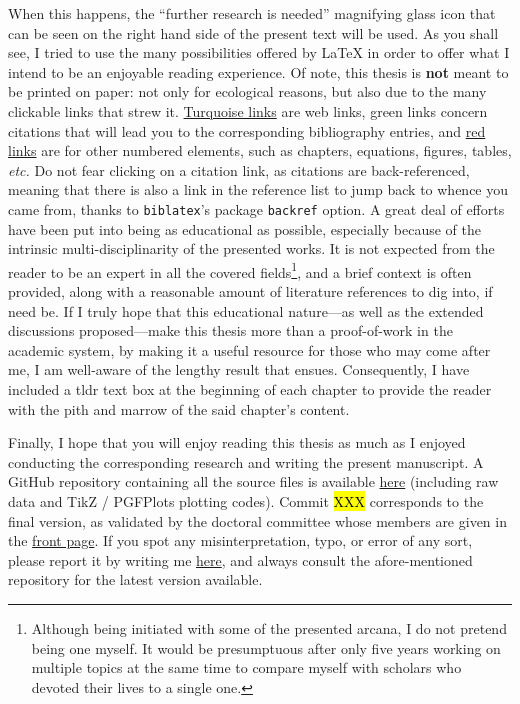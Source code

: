 \mfrin{}When this happens, the \enquote{further research is needed} magnifying glass icon that can be seen on the right hand side of the present text will be used. As you shall see, I tried to use the many possibilities offered by \LaTeX{} in order to offer what I intend to be an enjoyable reading experience. Of note, this thesis is \textbf{not} meant to be printed on paper: not only for ecological reasons, but also due to the many clickable links that strew it. \href{https://archive.org/details/lshort}{Turquoise links} are web links, green links\cite{oetiker2007} concern citations that will lead you to the corresponding bibliography entries, and \hyperlink{forechap:foreword}{red links} are for other numbered elements, such as chapters, equations, figures, tables, \emph{etc.} Do not fear clicking on a citation link, as citations are back-referenced, meaning that there is also a link in the reference list to jump back to whence you came from, thanks to \texttt{biblatex}'s package \texttt{backref} option.
\clearpage
A great deal of efforts have been put into being as educational as possible, especially because of the intrinsic multi-disciplinarity of the presented works. It is not expected from the reader to be an expert in all the covered fields\footnote{Although being initiated with some of the presented arcana, I do not pretend being one myself. It would be presumptuous after only five years working on multiple topics at the same time to compare myself with scholars who devoted their lives to a single one.}, and a brief context is often provided, along with a reasonable amount of literature references to dig into, if need be. If I truly hope that this educational nature---as well as the extended discussions proposed---make this thesis more than a proof-of-work in the academic system, \ie{} by making it a useful resource for those who may come after me, I am well-aware of the lengthy result that ensues. Consequently, I have included a \gls{tldr} text box at the beginning of each chapter to provide the reader with the pith and marrow of the said chapter's content.

Finally, I hope that you will enjoy reading this thesis as much as I enjoyed conducting the corresponding research and writing the present manuscript. A GitHub repository containing all the source files is available \href{https://github.com/e-dervieux/phd_thesis}{here} (including raw data and TikZ / PGFPlots plotting codes). Commit \hl{XXX} corresponds to the final version, as validated by the doctoral committee whose members are given in the \hyperlink{frontpage}{front page}. If you spot any misinterpretation, typo, or error of any sort, please report it by writing me  \href{mailto:emmanuel.dervieux@gmail.com}{here}, and always consult the afore-mentioned repository for the latest version available.

